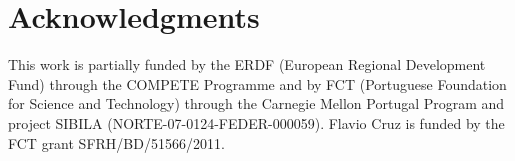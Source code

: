 \section*{Acknowledgments}

This work is partially funded by the ERDF (European Regional Development Fund)
through the COMPETE Programme and by FCT (Portuguese Foundation for Science and
Technology) through the Carnegie Mellon Portugal Program and project SIBILA
(NORTE-07-0124-FEDER-000059).  Flavio Cruz is funded by the FCT grant
SFRH/BD/51566/2011.
